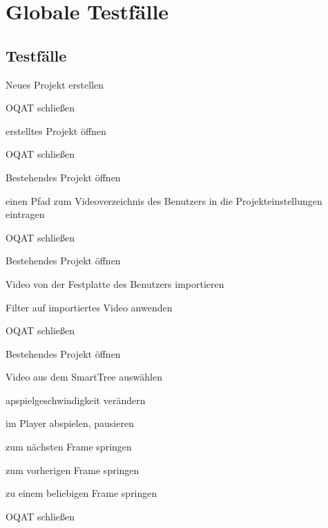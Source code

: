 \chapter{Globale Testfälle}
\section{Testfälle}
\setcounter{counterKriterien}{0}

\begin{compactitem}
\item Neues Projekt erstellen
\item OQAT schließen
\item erstelltes Projekt öffnen
\item OQAT schließen
\end{compactitem}
\begin{compactitem}
\item Bestehendes Projekt öffnen
\item einen Pfad zum Videoverzeichnis des Benutzers in die Projekteinstellungen eintragen
\item OQAT schließen
\end{compactitem}
\begin{compactitem}
\item Bestehendes Projekt öffnen
\item Video von der Festplatte des Benutzers importieren
\item Filter auf importiertes Video anwenden
\item OQAT schließen
\end{compactitem}
\begin{compactitem}
\item Bestehendes Projekt öffnen
\item Video aus dem SmartTree auswählen
\item apspielgeschwindigkeit verändern
\item im Player abspielen, pausieren
\item zum nächsten Frame springen
\item zum vorherigen Frame springen
\item zu einem beliebigen Frame springen
\item OQAT schließen
\end{compactitem}
